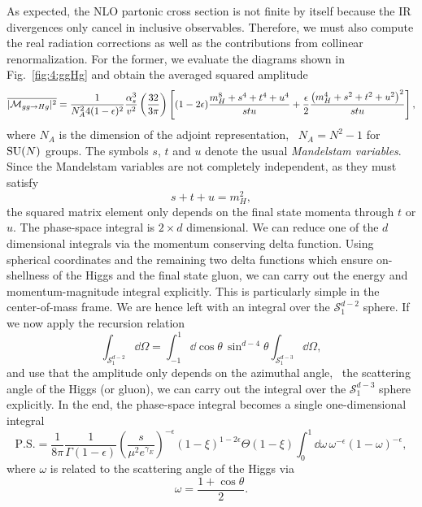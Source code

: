 As expected, the \acs{NLO} partonic cross section is not finite by itself because the \acs{IR} divergences only cancel in inclusive observables. Therefore, we must also compute the real radiation corrections as well as the contributions from collinear renormalization. For the former, we evaluate the diagrams shown in Fig.~\ref{fig:4:ggHg} and obtain the averaged squared amplitude
\begin{equation}
\overline{|\mathcal{M}_{gg \rightarrow H g}|^2} = \frac{1}{N_A^2 4 (1 - \epsilon)^2} \frac{\alpha_s^3}{v^2} \left(\frac{32}{3 \pi} \right) \left[ (1 - 2 \epsilon) \frac{m_H^8 + s^4 + t^4 + u^4}{stu} + \frac{\epsilon}{2} \frac{\left(m_H^4 + s^2 + t^2 + u^2 \right)^2}{stu} \right],
\label{eq:4:ggHg_Amp}
\end{equation}
where $N_A$ is the dimension of the adjoint representation, \ie\ $N_A = N^2 - 1$ for $\mathrm{SU}(N)$ groups. The symbols $s$, $t$ and $u$ denote the usual \textit{Mandelstam variables}. Since the Mandelstam variables are not completely independent, as they must satisfy
\begin{equation}
  s + t + u = m_H^2,
\end{equation}
the squared matrix element only depends on the final state momenta through $t$ or $u$. The phase-space integral is $2\times d$ dimensional. We can reduce one of the $d$ dimensional integrals via the momentum conserving delta function. Using spherical coordinates and the remaining two delta functions which ensure on-shellness of the Higgs and the final state gluon, we can carry out the energy and momentum-magnitude integral explicitly. This is particularly simple in the center-of-mass frame. We are hence left with an integral over the $\mathcal{S}_1^{d - 2}$ sphere. If we now apply the recursion relation
\begin{equation}
\int_{\mathcal{S}_1^{d - 2}} \dd \Omega = \int_{-1}^1 \dd\!\cos \theta \, \sin^{d - 4} \theta \int_{\mathcal{S}_1^{d - 3}} \dd \Omega,
\end{equation}
and use that the amplitude only depends on the azimuthal angle, \ie\ the scattering angle of the Higgs (or gluon), we can carry out the integral over the $\mathcal{S}_1^{d - 3}$ sphere explicitly. In the end, the phase-space integral becomes a single one-dimensional integral
\begin{equation}
\text{P.S.} = \frac{1}{8 \pi} \frac{1}{\Gamma (1 - \epsilon)} \left(\frac{s}{\mu^2 e^{\gamma_E}}\right)^{-\epsilon} \left(1 - \xi \right)^{1 - 2 \epsilon} \Theta (1 - \xi) \int_0^1 \dd \omega \, \omega^{-\epsilon} (1 - \omega)^{-\epsilon},
\label{eq:4:PS_measure}
\end{equation}
where $\omega$ is related to the scattering angle of the Higgs via
\begin{equation}
\omega = \frac{1 + \cos \theta}{2}.
\end{equation}

